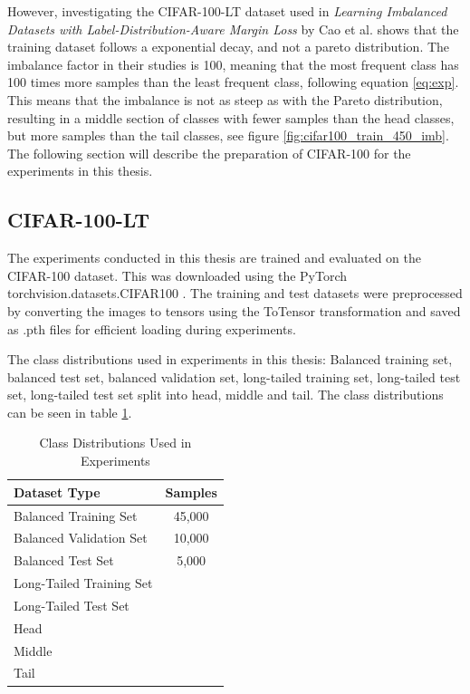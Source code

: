 However, investigating the CIFAR-100-LT dataset used in \emph{Learning Imbalanced Datasets with Label-Distribution-Aware Margin Loss} by Cao et al. \cite{cao2019learningimbalanceddatasetslabeldistributionaware} shows that the training dataset follows a exponential decay, and not a pareto distribution. The imbalance factor in their studies is 100, meaning that the most frequent class has 100 times more samples than the least frequent class, following equation \eqref{eq:exp}. This means that the imbalance is not as steep as with the Pareto distribution, resulting in a middle section of classes with fewer samples than the head classes, but more samples than the tail classes, see figure \ref{fig:cifar100_train_450_imb}. The following section will describe the preparation of CIFAR-100 for the experiments in this thesis.


\subsection{CIFAR-100-LT}
The experiments conducted in this thesis are trained and evaluated on the CIFAR-100 dataset. This was downloaded using the PyTorch torchvision.datasets.CIFAR100 \cite{pytorch_cifar100}. The training and test datasets were preprocessed by converting the images to tensors using the ToTensor transformation and saved as .pth files for efficient loading during experiments. 

The class distributions used in experiments in this thesis: Balanced training set, balanced test set, balanced validation set, long-tailed training set, long-tailed test set, long-tailed test set split into head, middle and tail. The class distributions can be seen in table \ref{tab:class_distributions}.

\begin{table}[h!]
    \centering
    \caption{Class Distributions Used in Experiments}
    \label{tab:class_distributions}
    \begin{tabular}{|l|c|}
    \hline
    \textbf{Dataset Type}                       & \textbf{Samples}                                                                 \\ \hline
    Balanced Training Set                       & 45,000        \\ \hline
    Balanced Validation Set                     & 10,000    \\ \hline
    Balanced Test Set                           & 5,000    \\ \hline
    Long-Tailed Training Set                    & \todo{-}      \\ \hline
    Long-Tailed Test Set                        & \todo{-} \\ \hline
    Head  & \todo{-} \\ \hline
    Middle   & \todo{-} \\ \hline
    Tail  & \todo{-} \\ \hline
    \end{tabular}
    \end{table}
    

